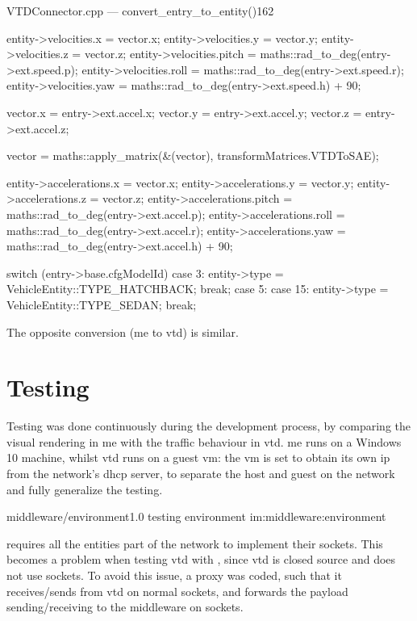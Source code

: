 \begin{codelist}{VTDConnector.cpp --- convert\_entry\_to\_entity()}{162}
{{		entity->velocities.x     = vector.x;
		entity->velocities.y     = vector.y;
		entity->velocities.z     = vector.z;
		entity->velocities.pitch = maths::rad_to_deg(entry->ext.speed.p);
		entity->velocities.roll  = maths::rad_to_deg(entry->ext.speed.r);
		entity->velocities.yaw   = maths::rad_to_deg(entry->ext.speed.h) + 90;

		vector.x = entry->ext.accel.x;
		vector.y = entry->ext.accel.y;
		vector.z = entry->ext.accel.z;

		vector = maths::apply_matrix(&(vector), transformMatrices.VTDToSAE);

		entity->accelerations.x     = vector.x;
		entity->accelerations.y     = vector.y;
		entity->accelerations.z     = vector.z;
		entity->accelerations.pitch = maths::rad_to_deg(entry->ext.accel.p);
		entity->accelerations.roll  = maths::rad_to_deg(entry->ext.accel.r);
		entity->accelerations.yaw   = maths::rad_to_deg(entry->ext.accel.h) + 90;
	}

	switch (entry->base.cfgModelId) {
		case 3:
			entity->type = VehicleEntity::TYPE_HATCHBACK;
			break;
		case 5:
		case 15:
			entity->type = VehicleEntity::TYPE_SEDAN;
			break;
	}
}
\end{codelist}

The opposite conversion (\gls{me} to \gls{vtd}) is similar.

\section{Testing}\label{sc:middleware:testing}

Testing was done continuously during the development process, by comparing the visual rendering in \gls{me} with the traffic behaviour in \gls{vtd}. \gls{me} runs on a Windows 10 machine, whilst \gls{vtd} runs on a guest \gls{vm}: the \gls{vm} is set to obtain its own \gls{ip} from the network's \gls{dhcp} server, to separate the host and guest on the network and fully generalize the testing.

\begin{image}
	{middleware/environment}{1.0}
	{testing environment}
	{im:middleware:environment}
	{}
\end{image} %

 requires all the entities part of the network to implement their sockets. This becomes a problem when testing \gls{vtd} with , since \gls{vtd} is closed source and does not use  sockets. To avoid this issue, a \gls{proxy} was coded, such that it receives/sends from \gls{vtd} on normal sockets, and forwards the \gls{payload} sending/receiving to the \gls{middleware} on  sockets.

